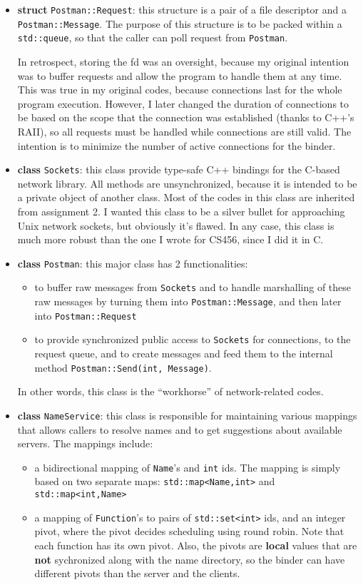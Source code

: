 \begin{itemize}
\item
{\bf struct} {\tt Postman::Request}: this structure is a pair of a file descriptor and a {\tt Postman::Message}.
The purpose of this structure is to be packed within a {\tt std::queue}, so that the caller can poll request from {\tt Postman}.

In retrospect, storing the fd was an oversight, because my original intention was to buffer requests and allow the program to handle them at any time.
This was true in my original codes, because connections last for the whole program execution.
However, I later changed the duration of connections to be based on the scope that the connection was established (thanks to C++'s RAII), so all requests must be handled while connections are still valid.
The intention is to minimize the number of active connections for the binder.

\item
{\bf class} {\tt Sockets}: this class provide type-safe C++ bindings for the C-based network library.
All methods are unsynchronized, because it is intended to be a private object of another class.
Most of the codes in this class are inherited from assignment 2.
I wanted this class to be a silver bullet for approaching Unix network sockets, but obviously it's flawed.
In any case, this class is much more robust than the one I wrote for CS456, since I did it in C.
\item
{\bf class} {\tt Postman}: this major class has 2 functionalities:
\begin{itemize}
\item
to buffer raw messages from {\tt Sockets} and to handle marshalling of these raw messages by turning them into {\tt Postman::Message}, and then later into {\tt Postman::Request}
\item
to provide synchronized public access to {\tt Sockets} for connections, to the request queue, and to create messages and feed them to the internal method {\tt Postman::Send(int, Message)}.
\end{itemize}

In other words, this class is the ``workhorse'' of network-related codes.

\item
{\bf class} {\tt NameService}: this class is responsible for maintaining various mappings that allows callers to resolve names and to get suggestions about available servers.
The mappings include:
\begin{itemize}
\item
a bidirectional mapping of {\tt Name}'s and {\tt int} ids.
The mapping is simply based on two separate maps: {\tt std::map<Name,int>} and {\tt std::map<int,Name>}
\item
a mapping of {\tt Function}'s to pairs of {\tt std::set<int>} ids, and an integer pivot, where the pivot decides scheduling using round robin.
Note that each function has its own pivot.
Also, the pivots are {\bf local} values that are {\bf not} sychronized along with the name directory, so the binder can have different pivots than the server and the clients.
\end{itemize}


\end{itemize}
